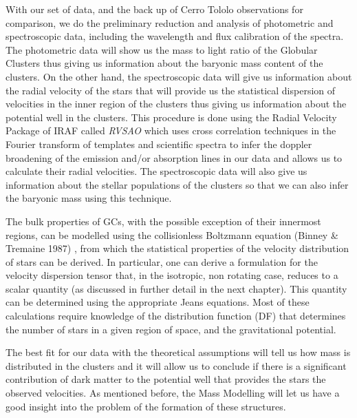 With our set of data, and the back up of Cerro Tololo observations for comparison, we do the preliminary reduction and analysis of photometric and spectroscopic data, including the wavelength and flux calibration of the spectra. The photometric data will show us the mass to light ratio of the Globular Clusters thus giving us information about the baryonic mass content of the clusters. On the other hand, the spectroscopic data will give us information about the radial velocity of the stars that will provide us the statistical dispersion of velocities in the inner region of the clusters thus giving us information about the potential well in the clusters.  This procedure is done using the Radial Velocity Package of IRAF called \textit{RVSAO} which uses cross correlation techniques in the Fourier transform of templates and scientific spectra to infer the doppler broadening of the emission and/or absorption lines in our data and allows us to calculate their radial velocities. The spectroscopic data will also give us information about the stellar populations of the clusters so that we can also infer the baryonic mass using this technique. 

The bulk properties of GCs, with the possible exception of their innermost regions, can be modelled using the collisionless Boltzmann equation (Binney \& Tremaine 1987) \cite{3}, from which the statistical properties of the velocity distribution of stars can be derived. In particular, one can derive a formulation for the velocity dispersion tensor that, in the isotropic, non rotating case, reduces to a scalar quantity (as discussed in further detail in the next chapter). This quantity can be determined using the appropriate Jeans equations. Most of these calculations require knowledge of the distribution function (DF) that determines the number of stars in a given region of space, and the gravitational potential.

The best fit for our data with the theoretical assumptions will tell us how mass is distributed in the clusters and it will allow us to conclude if there is a significant contribution of dark matter to the potential well that provides the stars the observed velocities. As mentioned before, the Mass Modelling will let us have a good insight into the problem of the formation of these structures.

\newpage
